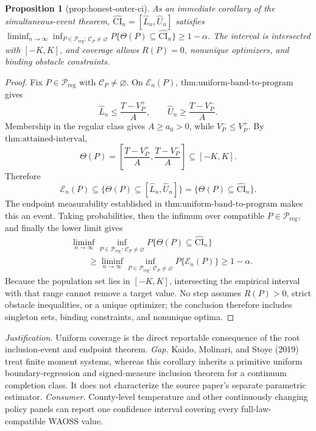 \documentclass{article}
\newtheorem{proposition}{Proposition}
\begin{document}
\begin{proposition}[prop:honest-outer-ci]\label{prop:honest-outer-ci}
As an immediate corollary of the simultaneous-event theorem, \(\widehat{\mathrm{CI}}_n=[\widehat L_n,\widehat U_n]\) satisfies \(\liminf_{n\to\infty}\inf_{P\in\mathcal P_{\mathrm{reg}}:\,\mathcal C_P\neq\varnothing}P\{\Theta(P)\subseteq\widehat{\mathrm{CI}}_n\}\ge1-\alpha\). The interval is intersected with \([-K,K]\), and coverage allows \(R(P)=0\), nonunique optimizers, and binding obstacle constraints.
\end{proposition}
\begin{proof}
Fix \(P\in\mathcal P_{\mathrm{reg}}\) with \(\mathcal C_P\neq\varnothing\).  On \(\mathcal E_n(P)\), \(\text{thm:uniform-band-to-program}\) gives
\[
 \widehat L_n\leq\frac{T-V_P^+}{A},
 \qquad
 \widehat U_n\geq\frac{T-V_P^-}{A}.
\]
Membership in the regular class gives \(A\geq a_0>0\), while \(V_P^-\leq V_P^+\).  By \(\text{thm:attained-interval}\),
\[
 \Theta(P)=
 \left[\frac{T-V_P^+}{A},\frac{T-V_P^-}{A}\right]
 \subseteq[-K,K].
\]
Therefore
\[
 \mathcal E_n(P)
 \subseteq
 \{\Theta(P)\subseteq[\widehat L_n,\widehat U_n]\}
 =\{\Theta(P)\subseteq\widehat{\mathrm{CI}}_n\}.
\]
The endpoint measurability established in \(\text{thm:uniform-band-to-program}\) makes this an event.  Taking probabilities, then the infimum over compatible \(P\in\mathcal P_{\mathrm{reg}}\), and finally the lower limit gives
\[
 \begin{aligned}
 &\liminf_{n\to\infty}
 \inf_{P\in\mathcal P_{\mathrm{reg}}:\,\mathcal C_P\neq\varnothing}
 P\{\Theta(P)\subseteq\widehat{\mathrm{CI}}_n\}\\
 &\qquad\geq
 \liminf_{n\to\infty}
 \inf_{P\in\mathcal P_{\mathrm{reg}}:\,\mathcal C_P\neq\varnothing}
 P\{\mathcal E_n(P)\}
 \geq1-\alpha.
 \end{aligned}
\]
Because the population set lies in \([-K,K]\), intersecting the empirical interval with that range cannot remove a target value.  No step assumes \(R(P)>0\), strict obstacle inequalities, or a unique optimizer; the conclusion therefore includes singleton sets, binding constraints, and nonunique optima.
\end{proof}
\par\smallskip\noindent \textit{Justification.} Uniform coverage is the direct reportable consequence of the root inclusion-event and endpoint theorem. \textit{Gap.} Kaido, Molinari, and Stoye (2019) treat finite moment systems, whereas this corollary inherits a primitive uniform boundary-regression and signed-measure inclusion theorem for a continuum completion class. It does not characterize the source paper's separate parametric estimator. \textit{Consumer.} County-level temperature and other continuously changing policy panels can report one confidence interval covering every full-law-compatible WAOSS value.
\end{document}
